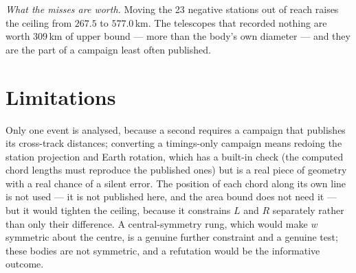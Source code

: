 \documentclass[11pt]{article}
\begin{document}
\emph{What the misses are worth.} Moving the 23 negative stations out of reach
raises the ceiling from $267.5$ to $577.0$\,km. The telescopes that recorded
nothing are worth $309$\,km of upper bound --- more than the body's own diameter
--- and they are the part of a campaign least often published.

\section{Limitations}

Only one event is analysed, because a second requires a campaign that publishes
its cross-track distances; converting a timings-only campaign means redoing the
station projection and Earth rotation, which has a built-in check (the computed
chord lengths must reproduce the published ones) but is a real piece of geometry
with a real chance of a silent error. The position of each chord along its own
line is not used --- it is not published here, and the area bound does not need
it --- but it would tighten the ceiling, because it constrains $L$ and $R$
separately rather than only their difference. A central-symmetry rung, which
would make $w$ symmetric about the centre, is a genuine further constraint and a
genuine test; these bodies are not symmetric, and a refutation would be the
informative outcome.
\end{document}
